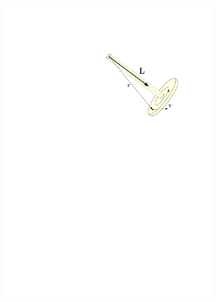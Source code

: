 \documentclass[final,3p,mathptmx]{elsarticle}
\begin{document}
\begin{figure}[h]
	
	\centering
	\begin{subfigure}{0.25\textwidth}
		\includegraphics[width=\textwidth, keepaspectratio]{figures/gyro3.pdf}
		\label{fig:gyro:def}
	\end{subfigure}\ \ \ \ \ \ 
	\begin{subfigure}{0.32\textwidth}

\end{subfigure}
\end{figure}
\end{document}
